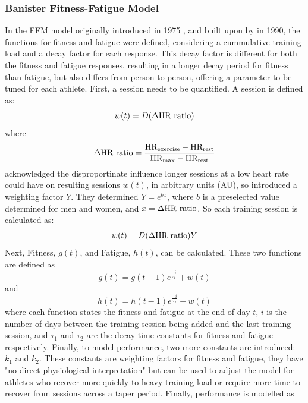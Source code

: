 \subsubsection{Banister Fitness-Fatigue Model}
 In the FFM model originally introduced in 1975 \cite{Bannister1976}, and built upon by \textcite{Morton1990} in 1990, the functions for fitness and fatigue were defined, considering a cummulative training load and a decay factor for each response. This decay factor is different for both the fitness and fatigue responses, resulting in a longer decay period for fitness than fatigue, but also differs from person to person, offering a parameter to be tuned for each athlete. First, a session needs to be quantified. A session is defined as:
\begin{equation}\label{eq:ban_imp_base}
  w(t) = D (\Delta \textnormal{HR ratio})
\end{equation}
where
\begin{equation*}
  \Delta \textnormal{HR ratio} = \frac{\textnormal{HR}_\textnormal{exercise} - \textnormal{HR}_\textnormal{rest}}{\textnormal{HR}_\textnormal{max} - \textnormal{HR}_\textnormal{rest}}
\end{equation*}
\textcite{Morton1990} acknowledged the disproportinate influence longer sessions at a low heart rate could have on resulting sessions $w(t)$, in arbitrary units (AU), so introduced a weighting factor $Y$. They determined $Y = e^{bx}$, where $b$ is a preselected value determined for men and women, and $x = \Delta \textnormal{HR ratio}$. So each training session is calculated as:
\begin{equation}\label{eq:ban_impulse}
  w(t) = D (\Delta \textnormal{HR ratio})Y
\end{equation}
Next, Fitness, $g(t)$, and Fatigue, $h(t)$, can be calculated. These two functions are defined as
\begin{equation}\label{eq:ban_fit}
  g(t) = g(t - 1)e^\frac{-i}{\tau_1} + w(t)
\end{equation}
and
\begin{equation}\label{eq:ban_fat}
  h(t) = h(t - 1)e^\frac{-i}{\tau_2} + w(t)
\end{equation}
where each function states the fitness and fatigue at the end of day $t$, $i$ is the number of days between the training session being added and the last training session, and $\tau_1$ and $\tau_2$ are the decay time constants for fitness and fatigue respectively. Finally, to model performance, two more constants are introduced: $k_1$ and $k_2$. These constants are weighting factors for fitness and fatigue, they have "no direct physiological interpretation" \cite{Morton1990} but can be used to adjust the model for athletes who recover more quickly to heavy training load or require more time to recover from sessions across a taper period. Finally, performance is modelled as
